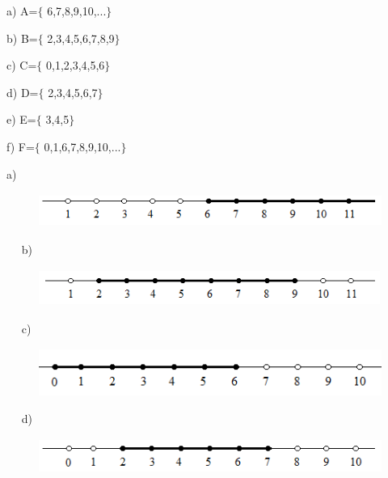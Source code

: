 \begin{respostas}{2}
	\ansitem{}
	\begin{multicols}{3}
		
	a) A=$ \{ $ 6,7,8,9,10,...$ \} $
	
	b) B=$ \{ $ 2,3,4,5,6,7,8,9$ \} $
	
	c) C=$ \{ $ 0,1,2,3,4,5,6$ \} $ 

	d) D=$ \{ $ 2,3,4,5,6,7$ \} $
	
	e) E=$ \{ $ 3,4,5$ \} $ 
	
	f) F=$ \{ $ 0,1,6,7,8,9,10,...$ \} $ 
	\end{multicols}
	\ansitem{}
a) 
\begin{figure}[H]
	\begin{Center}
		\includegraphics[width=4.46in,height=0.43in]{capitulos/conjuntos_numericos/media/image11.png}
	\end{Center}
\end{figure}
~~
b) 
\begin{figure}[H]
	\begin{Center}
		\includegraphics[width=4.4in,height=0.48in]{capitulos/conjuntos_numericos/media/image12.png}
	\end{Center}
\end{figure}
~~
c)
\begin{figure}[H]
	\begin{Center}
		\includegraphics[width=4.56in,height=0.61in]{capitulos/conjuntos_numericos/media/image13.png}
	\end{Center}
\end{figure}
~~
d)
\begin{figure}[H]
	\begin{Center}
		\includegraphics[width=4.84in,height=0.45in]{capitulos/conjuntos_numericos/media/image14.png}
	\end{Center}

\end{figure}
\end{respostas}
